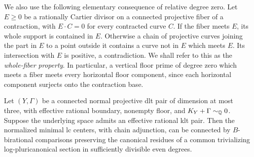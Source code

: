 We also use the following elementary consequence of relative
degree zero.  Let $E\ge0$ be a rationally Cartier divisor on a
connected projective fiber of a contraction, with $E\cdot C=0$
for every contracted curve $C$.  If the fiber meets $E$, its
whole support is contained in $E$.  Otherwise a chain of
projective curves joining the part in $E$ to a point outside
it contains a curve not in $E$ which meets $E$.  Its
intersection with $E$ is positive, a contradiction.  We shall
refer to this as the \emph{whole-fiber property}.  In particular,
a vertical floor prime of degree zero which meets a fiber
meets every horizontal floor component, since each horizontal
component surjects onto the contraction base.

\begin{lemma}
\label{floor:trivial-linking}
Let $(Y,\Gamma)$ be a connected normal projective dlt pair of
dimension at most three, with effective rational boundary,
nonempty floor, and
$K_Y+\Gamma\sim_{\mathbb{Q}}0$.  Suppose the underlying space admits
an effective rational klt pair.  Then the normalized minimal
lc centers, with chain adjunction, can be connected by
$B$-birational comparisons preserving the canonical residues
of a common trivializing log-pluricanonical section in
sufficiently divisible even degrees.
\end{lemma}

